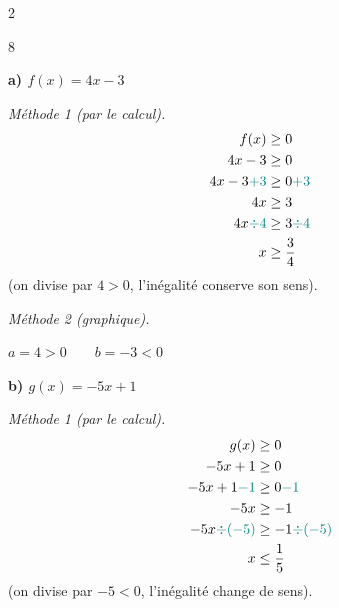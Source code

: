 \documentclass[10pt,a4paper]{article}
\begin{document}
\begin{multicols}{2}

\begin{corr}{8}


\textbf{a) \(f(x)=4x-3\)}

\smallskip

\textit{Méthode 1 (par le calcul).}
\[
\begin{aligned}
f(x) &\geq 0\\
4x-3 &\geq 0\\
4x-3\textcolor{teal}{+3} &\geq 0\textcolor{teal}{+3}\\
4x &\geq 3\\
4x\textcolor{teal}{\div 4} &\geq 3\textcolor{teal}{\div 4}\\
x &\geq \frac{3}{4}
\end{aligned}
\]
(on divise par \(4>0\), l'inégalité conserve son sens).

\smallskip

\textit{Méthode 2 (graphique).}

\begin{center}

\(a=4>0 \qquad b=-3<0\)
\end{center}

\begin{center}
\end{center}

\bigskip

\textbf{b) \(g(x)=-5x+1\)}

\smallskip

\textit{Méthode 1 (par le calcul).}
\[
\begin{aligned}
g(x) &\geq 0\\
-5x+1 &\geq 0\\
-5x+1\textcolor{teal}{-1} &\geq 0\textcolor{teal}{-1}\\
-5x &\geq -1\\
-5x\textcolor{teal}{\div(-5)} &\geq -1\textcolor{teal}{\div(-5)}\\
x &\leq \frac{1}{5}
\end{aligned}
\]
(on divise par \(-5<0\), l'inégalité change de sens).


\end{corr}
\end{multicols}
\end{document}

